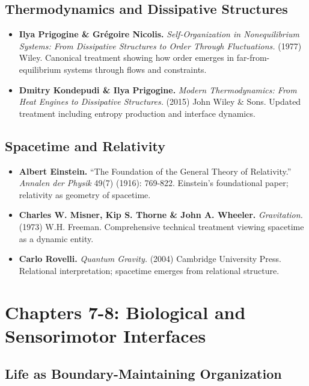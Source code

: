 \documentclass[
  openright]{book}
\begin{document}
\subsection{Thermodynamics and Dissipative
Structures}\label{thermodynamics-and-dissipative-structures}

\begin{itemize}
\item
  \textbf{Ilya Prigogine \& Grégoire Nicolis.} \emph{Self-Organization
  in Nonequilibrium Systems: From Dissipative Structures to Order
  Through Fluctuations.} (1977) Wiley. Canonical treatment showing how
  order emerges in far-from-equilibrium systems through flows and
  constraints.
\item
  \textbf{Dmitry Kondepudi \& Ilya Prigogine.} \emph{Modern
  Thermodynamics: From Heat Engines to Dissipative Structures.} (2015)
  John Wiley \& Sons. Updated treatment including entropy production and
  interface dynamics.
\end{itemize}

\subsection{Spacetime and Relativity}\label{spacetime-and-relativity}

\begin{itemize}
\item
  \textbf{Albert Einstein.} ``The Foundation of the General Theory of
  Relativity.'' \emph{Annalen der Physik} 49(7) (1916): 769-822.
  Einstein's foundational paper; relativity as geometry of spacetime.
\item
  \textbf{Charles W. Misner, Kip S. Thorne \& John A. Wheeler.}
  \emph{Gravitation.} (1973) W.H. Freeman. Comprehensive technical
  treatment viewing spacetime as a dynamic entity.
\item
  \textbf{Carlo Rovelli.} \emph{Quantum Gravity.} (2004) Cambridge
  University Press. Relational interpretation; spacetime emerges from
  relational structure.
\end{itemize}

\section{Chapters 7-8: Biological and Sensorimotor
Interfaces}\label{chapters-7-8-biological-and-sensorimotor-interfaces}

\subsection{Life as Boundary-Maintaining
Organization}\label{life-as-boundary-maintaining-organization}
\end{document}
